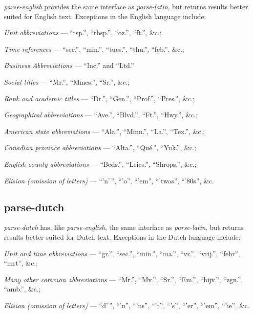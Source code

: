 \emph{parse-english} provides the same interface as \emph{parse-latin}, but
returns results better suited for English text.
Exceptions in the English language include:

\begin{aenumerate}
\item \emph{Unit abbreviations} --- ``tsp.'', ``tbsp.'', ``oz.'', ``ft.'',
  \&c.;
\item\emph{Time references} --- ``sec.'', ``min.'', ``tues.'', ``thu.'',
  ``feb.'', \&c.;
\item\emph{Business Abbreviations} --- ``Inc.'' and ``Ltd.''
\item\emph{Social titles} --- ``Mr.'', ``Mmes.'', ``Sr.'', \&c.;
\item\emph{Rank and academic titles} --- ``Dr.'', ``Gen.'', ``Prof.'',
  ``Pres.'', \&c.;
\item\emph{Geographical abbreviations} --- ``Ave.'', ``Blvd.'', ``Ft.'',
  ``Hwy.'', \&c.;
\item\emph{American state abbreviations} --- ``Ala.'', ``Minn.'', ``La.'',
  ``Tex.'', \&c.;
\item\emph{Canadian province abbreviations} --- ``Alta.'', ``Qué.'',
  ``Yuk.'', \&c.;
\item\emph{English county abbreviations} --- ``Beds.'', ``Leics.'',
  ``Shrops.'', \&c.;
\item\emph{Elision (omission of letters)} --- ``'n'\,'', ``'o'', ``'em'',
  ``'twas'', ``'80s'', \&c.
\end{aenumerate}

\subsection{parse-dutch}\label{parse-dutch}

\emph{parse-dutch} has, like \emph{parse-english}, the same interface as
\emph{parse-latin}, but returns results better suited for Dutch text.
Exceptions in the Dutch language include:

\begin{aenumerate}
\item\emph{Unit and time abbreviations} --- ``gr.'', ``sec.'', ``min.'', ``ma.'',
  ``vr.'', ``vrij.'', ``febr'', ``mrt'', \&c.;
\item\emph{Many other common abbreviations} --- ``Mr.'', ``Mv.'', ``Sr.'',
  ``Em.'', ``bijv.'', ``zgn.'', ``amb.'', \&c.;
\item\emph{Elision (omission of letters)} --- ``d'\,'', ``'n'', ``'ns'',
  ``'t'', ``'s'', ``'er'', ``'em'', ``'ie'', \&c.
\end{aenumerate}

